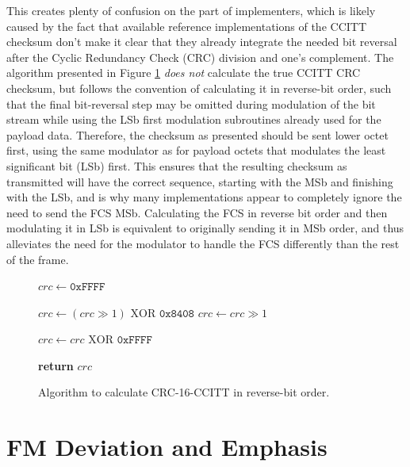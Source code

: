 This creates plenty of confusion on the part of implementers, 
which is likely caused by the fact that 
available reference implementations of the CCITT checksum don't
make it clear that they already integrate the needed bit reversal 
after the Cyclic Redundancy Check (CRC) division and one's complement.
The algorithm presented in Figure \ref{fig:crcccittcode} 
\emph{does not} calculate the true CCITT CRC checksum, but
follows the convention of
calculating it in reverse-bit order, such that the final bit-reversal step 
may be omitted during modulation of the bit stream while using the LSb first
modulation subroutines already used for the payload data.
Therefore, the checksum as presented should be sent lower octet first, 
using the same modulator as for payload octets that modulates the 
least significant bit (LSb) first.
This ensures that the resulting checksum as transmitted will have the 
correct sequence, starting with the MSb and finishing with the LSb,
and is why many implementations appear to completely ignore the
need to send the FCS MSb.
Calculating the FCS in reverse bit order and then modulating it in LSb
is equivalent to originally sending it in MSb order,
and thus alleviates the need for 
the modulator to handle the FCS differently than the rest of the frame.

\begin{figure}
	\begin{algorithmic}[1]
		\State $crc \gets \texttt{0xFFFF}$

			\State $crc \gets (crc \gg 1) \textrm{ XOR } \texttt{0x8408}$
		\Else
			\State $crc \gets crc \gg 1$
		\EndIf
		\EndFor
		\EndFor

		\State $crc \gets crc \textrm{ XOR } \texttt{0xFFFF}$

		\State \textbf{return} $crc$
		\EndFunction
	\end{algorithmic}
	\caption{Algorithm to calculate CRC-16-CCITT in reverse-bit order.}
	\label{fig:crcccittcode}
\end{figure}

\section{FM Deviation and Emphasis}

